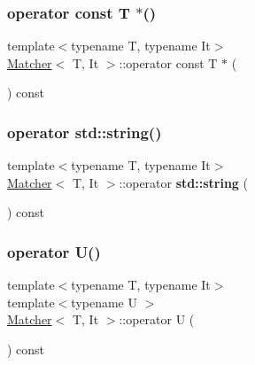 \mbox{\label{class_matcher_ae3f74b07e355126855e40db722c7a51d}} 
\subsubsection{\texorpdfstring{operator const T $\ast$()}{operator const T *()}}
{\footnotesize\ttfamily template$<$typename T, typename It$>$ \\
\hyperlink{class_matcher}{Matcher}$<$ T, It $>$\+::operator const T $\ast$ (\begin{DoxyParamCaption}{ }\end{DoxyParamCaption}) const\hspace{0.3cm}{\ttfamily [inline]}}

\mbox{\label{class_matcher_adc54a96fcfc40186d82a91baeb09211c}} 
\subsubsection{\texorpdfstring{operator std\+::string()}{operator std::string()}}
{\footnotesize\ttfamily template$<$typename T, typename It$>$ \\
\hyperlink{class_matcher}{Matcher}$<$ T, It $>$\+::operator \textbf{ std\+::string} (\begin{DoxyParamCaption}{ }\end{DoxyParamCaption}) const\hspace{0.3cm}{\ttfamily [inline]}}

\mbox{\label{class_matcher_a0bd21eb19304624235c6cb208fa1216a}} 
\subsubsection{\texorpdfstring{operator U()}{operator U()}}
{\footnotesize\ttfamily template$<$typename T, typename It$>$ \\
template$<$typename U $>$ \\
\hyperlink{class_matcher}{Matcher}$<$ T, It $>$\+::operator U (\begin{DoxyParamCaption}{ }\end{DoxyParamCaption}) const\hspace{0.3cm}{\ttfamily [inline]}}

